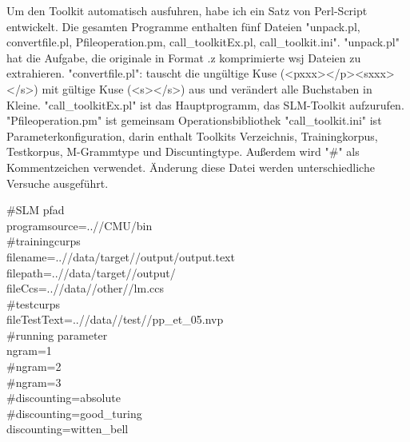 
Um den Toolkit automatisch ausfuhren, habe ich ein Satz von Perl-Script entwickelt. 
Die gesamten Programme enthalten f\"unf Dateien "unpack.pl, convertfile.pl, Pfileoperation.pm, call\_toolkitEx.pl, call\_toolkit.ini".
"unpack.pl" hat die Aufgabe, die originale in Format .z komprimierte  wsj Dateien zu extrahieren.
"convertfile.pl": tauscht die ung\"ultige Kuse (<pxxx></p><sxxx></s>) mit g\"ultige Kuse (<s></s>) aus und ver\"andert alle Buchstaben in Kleine. 
"call\_toolkitEx.pl" ist das Hauptprogramm, das SLM-Toolkit aufzurufen. 
"Pfileoperation.pm" ist gemeinsam Operationsbibliothek
"call\_toolkit.ini" ist Parameterkonfiguration, darin enthalt Toolkits Verzeichnis, Trainingkorpus, Testkorpus, M-Grammtype und Discuntingtype. Au\ss erdem wird  "\#"  als Kommentzeichen verwendet. \"Anderung diese Datei werden unterschiedliche Versuche ausgef\"uhrt.

\#SLM pfad \\
programsource=..//CMU/bin \\
\#trainingcurps \\
filename=..//data/target//output/output.text \\
filepath=..//data/target//output/ \\
fileCcs=..//data//other//lm.ccs \\
\#testcurps \\
fileTestText=..//data//test//pp\_et\_05.nvp \\
\#running  parameter \\
ngram=1 \\
\#ngram=2 \\
\#ngram=3 \\
\#discounting=absolute \\
\#discounting=good\_turing \\
discounting=witten\_bell \\
